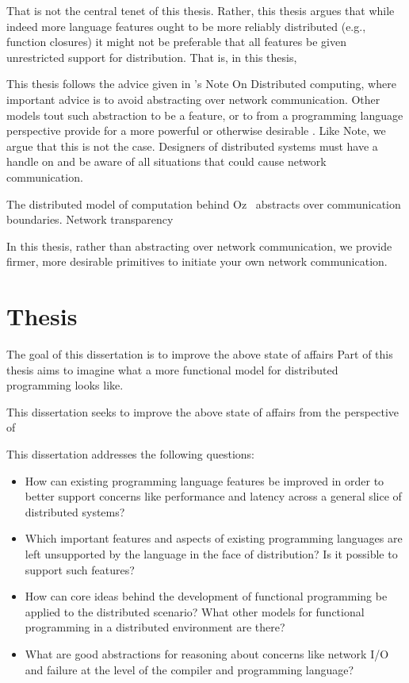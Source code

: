 That is not the central tenet of this thesis. Rather, this thesis argues that
while indeed more language features ought to be more reliably distributed (e.g.,
function closures) it might not be preferable that all features be given
unrestricted support for distribution. That is, in this thesis,

This thesis follows the advice given in 's Note On Distributed computing, where
important advice is to avoid abstracting over network communication. Other
models tout such abstraction to be a feature, or to from a programming language
perspective provide for a more powerful or otherwise desirable . Like Note, we
argue that this is not the case. Designers of distributed systems must have a
handle on and be aware of all situations that could cause network communication.

The distributed model of computation behind Oz~\cite{DistributedOz} abstracts
over communication boundaries. Network transparency
~\cite{ConceptsTechniquesModelsProgramming}

In this thesis, rather than abstracting over network communication, we provide
firmer, more desirable primitives to initiate your own network communication.


\section{Thesis}

The goal of this dissertation is to improve the above state of affairs
Part of this thesis aims to imagine what a more functional model for distributed programming looks like.

This dissertation seeks to improve the above state of affairs from the
perspective of

This dissertation addresses the following questions:

\begin{itemize}

	\item How can existing programming language features be improved in order to
	better support concerns like performance and latency across a general slice of
	distributed systems?

	\item Which important features and aspects of existing programming languages
	are left unsupported by the language in the face of distribution? Is it
	possible to support such features?

	\item How can core ideas behind the development of functional programming be
	applied to the distributed scenario? What other models for functional
	programming in a distributed environment are there?

	\item What are good abstractions for reasoning about concerns like network I/O
	and failure at the level of the compiler and programming language?

\end{itemize}

